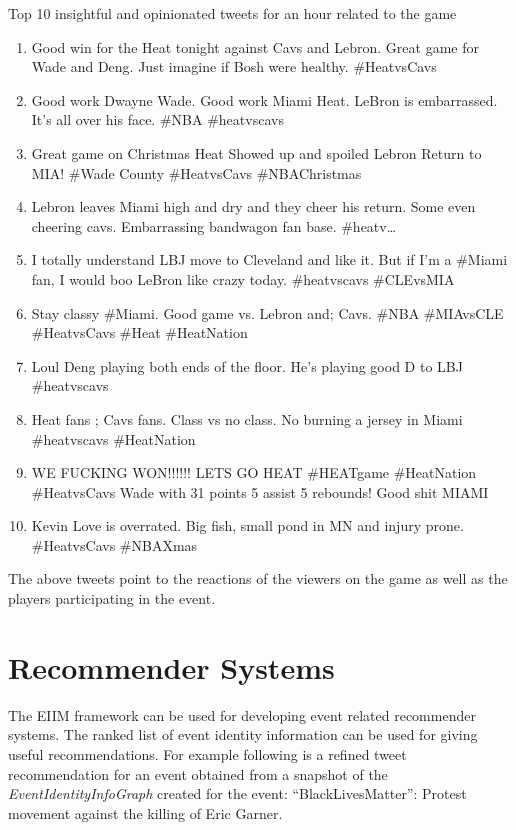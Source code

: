 Top 10 insightful and opinionated tweets for an hour related to the game
\begin{enumerate}

\item	Good win for the Heat tonight against Cavs and Lebron. Great game for Wade and Deng. Just imagine if Bosh were healthy. \#HeatvsCavs

\item	Good work Dwayne Wade. Good work Miami Heat. LeBron is embarrassed. It's all over his face. \#NBA \#heatvscavs

\item	Great game on Christmas Heat Showed up and spoiled Lebron Return to MIA! \#Wade County \#HeatvsCavs \#NBAChristmas

\item	Lebron leaves Miami high and dry and they cheer his return. Some even cheering cavs. Embarrassing bandwagon fan base. \#heatv…

\item	I totally understand LBJ move to Cleveland and like it. But if I'm a \#Miami fan, I would boo LeBron like crazy today. \#heatvscavs \#CLEvsMIA

\item	Stay classy \#Miami. Good game vs. Lebron and; Cavs. \#NBA \#MIAvsCLE \#HeatvsCavs \#Heat \#HeatNation

\item Loul Deng playing both ends of the floor. He's playing good D to LBJ \#heatvscavs

\item	Heat fans ; Cavs fans. Class vs no class. No burning a jersey in Miami \#heatvscavs \#HeatNation

\item	WE FUCKING WON!!!!!! LETS GO HEAT \#HEATgame \#HeatNation \#HeatvsCavs Wade with 31 points 5 assist 5 rebounds! Good shit MIAMI

\item	Kevin Love is overrated. Big fish, small pond in MN and injury prone. \#HeatvsCavs \#NBAXmas

\end{enumerate}

The above tweets point to the reactions of the viewers on the game as well as the players participating in the event.

\section{Recommender Systems}
The EIIM framework can be used for developing event related recommender systems. The ranked list of event identity information can be used for giving useful recommendations. For example following is a refined tweet recommendation for an event obtained from a snapshot of the \textit{EventIdentityInfoGraph} created for the event: “BlackLivesMatter”: Protest movement against the killing of Eric Garner.

